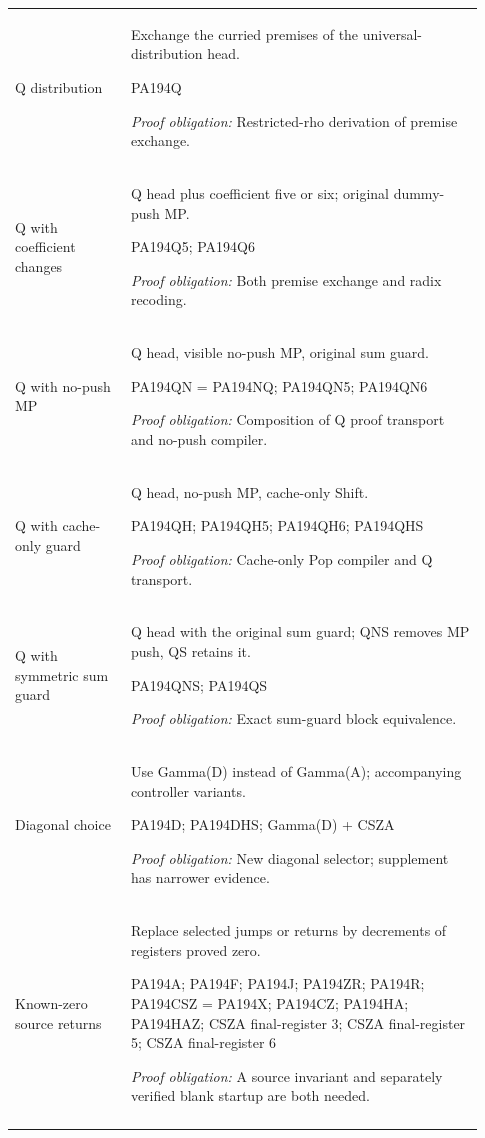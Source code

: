 \begin{longtable}{>{\raggedright\arraybackslash}p{0.23\linewidth}>{\raggedright\arraybackslash}p{0.70\linewidth}}
Q distribution & Exchange the curried premises of the universal-distribution head. \par\smallskip PA194Q \par\smallskip\emph{Proof obligation:} Restricted-rho derivation of premise exchange.\\\addlinespace[5pt]
Q with coefficient changes & Q head plus coefficient five or six; original dummy-push MP. \par\smallskip PA194Q5; PA194Q6 \par\smallskip\emph{Proof obligation:} Both premise exchange and radix recoding.\\\addlinespace[5pt]
Q with no-push MP & Q head, visible no-push MP, original sum guard. \par\smallskip PA194QN = PA194NQ; PA194QN5; PA194QN6 \par\smallskip\emph{Proof obligation:} Composition of Q proof transport and no-push compiler.\\\addlinespace[5pt]
Q with cache-only guard & Q head, no-push MP, cache-only Shift. \par\smallskip PA194QH; PA194QH5; PA194QH6; PA194QHS \par\smallskip\emph{Proof obligation:} Cache-only Pop compiler and Q transport.\\\addlinespace[5pt]
Q with symmetric sum guard & Q head with the original sum guard; QNS removes MP push, QS retains it. \par\smallskip PA194QNS; PA194QS \par\smallskip\emph{Proof obligation:} Exact sum-guard block equivalence.\\\addlinespace[5pt]
Diagonal choice & Use Gamma(D) instead of Gamma(A); accompanying controller variants. \par\smallskip PA194D; PA194DHS; Gamma(D) + CSZA \par\smallskip\emph{Proof obligation:} New diagonal selector; supplement has narrower evidence.\\\addlinespace[5pt]
Known-zero source returns & Replace selected jumps or returns by decrements of registers proved zero. \par\smallskip PA194A; PA194F; PA194J; PA194ZR; PA194R; PA194CSZ = PA194X; PA194CZ; PA194HA; PA194HAZ; CSZA final-register 3; CSZA final-register 5; CSZA final-register 6 \par\smallskip\emph{Proof obligation:} A source invariant and separately verified blank startup are both needed.\\\addlinespace[5pt]

\end{longtable}
